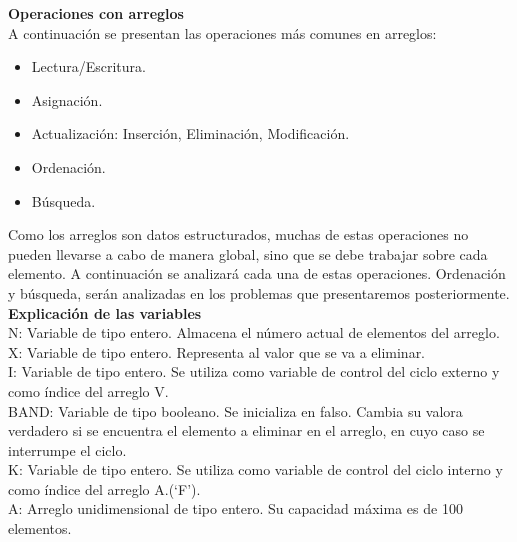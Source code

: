 \documentclass[11pt]{amsart}
\begin{document}
\noindent \textbf {Operaciones con arreglos} \\

\noindent  A continuación se presentan las operaciones más comunes en arreglos:\\
\begin{itemize}
  \item Lectura/Escritura.
  \item Asignación.
  \item Actualización: Inserción,
                                 Eliminación,
                                 Modificación.
  \item Ordenación.
  \item Búsqueda.
  \end{itemize}
\noindent Como los arreglos son datos estructurados, muchas de estas operaciones no pueden llevarse a cabo de manera global, sino que se debe trabajar sobre cada elemento. A continuación se analizará cada una de estas operaciones. Ordenación y búsqueda, serán analizadas en los problemas que presentaremos posteriormente.\\

\noindent \textbf {Explicación de las variables} \\

\noindent \quad N: Variable de tipo entero. Almacena el número actual de elementos del arreglo.\\

\noindent \quad X: Variable de tipo entero. Representa al valor que se va a eliminar.\\

\noindent \quad I: Variable de tipo entero. Se utiliza como variable de control del ciclo externo y como índice del arreglo V.\\

\noindent \quad BAND: Variable de tipo booleano. Se inicializa en falso. Cambia su valora verdadero si se encuentra el elemento a eliminar en el arreglo, en cuyo caso se interrumpe el ciclo.\\

\noindent \quad K: Variable de tipo entero. Se utiliza como variable de control del ciclo interno y como índice del arreglo A.(‘F’).\\

\noindent \quad A: Arreglo unidimensional de tipo entero. Su capacidad máxima es de 100 elementos. \\
\end{document}
